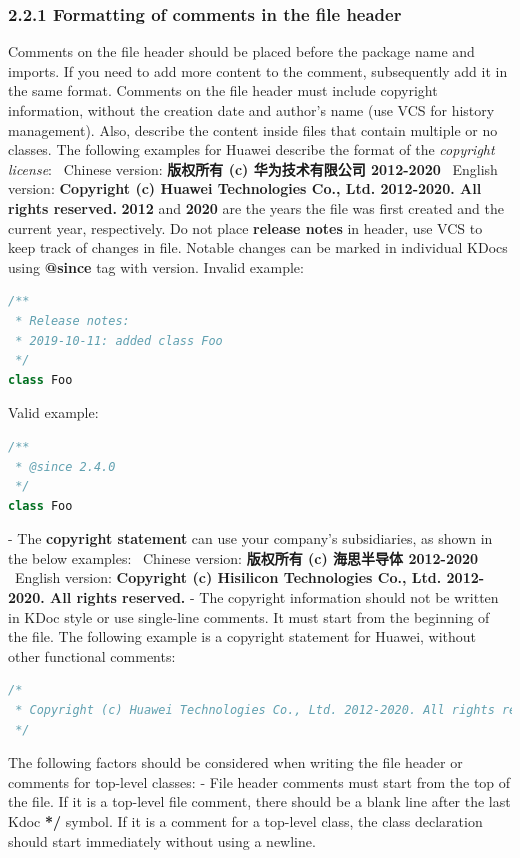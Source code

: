 \subsubsection*{\textbf{2.2.1 Formatting of comments in the file header}}
\leavevmode\newline
\label{sec:2.2.1}
Comments on the file header should be placed before the package name and imports. If you need to add more content to the comment, subsequently add it in the same format.
Comments on the file header must include copyright information, without the creation date and author's name (use VCS for history management).
Also, describe the content inside files that contain multiple or no classes.
The following examples for Huawei describe the format of the \textit{copyright license}: \
Chinese version: \textbf{版权所有 (c) 华为技术有限公司 2012-2020} \
English version: \textbf{Copyright (c) Huawei Technologies Co., Ltd. 2012-2020. All rights reserved.}
\textbf{2012} and \textbf{2020} are the years the file was first created and the current year, respectively.
Do not place \textbf{release notes} in header, use VCS to keep track of changes in file. Notable changes can be marked in individual KDocs using \textbf{@since} tag with version.
Invalid example:
\begin{lstlisting}[language=Kotlin]
/**
 * Release notes:
 * 2019-10-11: added class Foo
 */
class Foo
\end{lstlisting}
Valid example:
\begin{lstlisting}[language=Kotlin]
/**
 * @since 2.4.0
 */
class Foo
\end{lstlisting}
- The \textbf{copyright statement} can use your company's subsidiaries, as shown in the below examples: \
Chinese version: \textbf{版权所有 (c) 海思半导体 2012-2020} \
English version: \textbf{Copyright (c) Hisilicon Technologies Co., Ltd. 2012-2020. All rights reserved.} 
- The copyright information should not be written in KDoc style or use single-line comments. It must start from the beginning of the file.
The following example is a copyright statement for Huawei, without other functional comments:
\begin{lstlisting}[language=Kotlin]
/*
 * Copyright (c) Huawei Technologies Co., Ltd. 2012-2020. All rights reserved.
 */
\end{lstlisting}
The following factors should be considered when writing the file header or comments for top-level classes:
- File header comments must start from the top of the file. If it is a top-level file comment, there should be a blank line after the last Kdoc \textbf{*/} symbol. If it is a comment for a top-level class, the class declaration should start immediately without using a newline.
